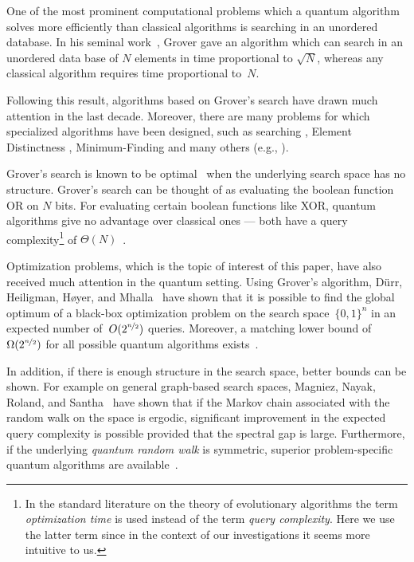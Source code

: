 One of the most prominent computational problems which a quantum algorithm solves more efficiently than classical algorithms is searching in an unordered database. In his seminal work~\cite{Grover96}, Grover gave an algorithm which can search in an unordered data base of $N$ elements in time proportional to $\sqrt{N}$, whereas any classical algorithm requires time proportional to~$N$.

Following this result, algorithms based on Grover's search have drawn much attention in the last decade. Moreover, there are many problems for which specialized algorithms have been designed, such as searching \cite{Grover96,BoyerBHT98}, Element Distinctness \cite{Santha08}, Minimum-Finding \cite{DurrH96} and many others (e.g., \cite{DurrHHM04,BerzinaDFLS04,Zhangthesis06}).

Grover's search is known to be optimal~\cite{BennetBBGV1997,Zalka99} when the underlying search space has no structure. Grover's search can be thought of as evaluating the boolean function OR on $N$ bits. For evaluating certain boolean functions like XOR, quantum algorithms give no advantage over classical ones --- both have a query complexity\footnote{In the standard literature on the theory of evolutionary algorithms the term \emph{optimization time} is used instead of the term \emph{query complexity}. Here we use the latter term since in the context of our investigations it seems more intuitive to us.} of $\Theta(N)$~\cite{Ambainis2002,BealsBCM2001}.

Optimization problems, which is the topic of interest of this paper, have also received much attention in the quantum setting.  Using Grover's algorithm, D{\"u}rr, Heiligman, H{\o}yer, and Mhalla~\cite{DurrHHM06} have shown that it is possible to find the global optimum of a black-box optimization problem on the search space~$\{0,1\}^n$ in an expected number of~${O}(2^{\nicefrac{n}{2}})$ queries. Moreover, a matching lower bound of~$\Omega(2^{\nicefrac{n}{2}})$ for all possible quantum algorithms exists~\cite{Zalka99}.

In addition, if there is enough structure in the search space, better bounds can be shown. For example on general graph-based search spaces, Magniez, Nayak, Roland, and Santha~\cite[Theorem 3]{MagniezNRS09} have shown that if the Markov chain associated with the random walk on the space is ergodic, significant improvement in the expected query complexity is possible provided that the spectral gap is large. Furthermore, if the underlying \emph{quantum random walk} is symmetric, superior problem-specific quantum algorithms are available~\cite{Szegedy04,MagniezNRS07}.

